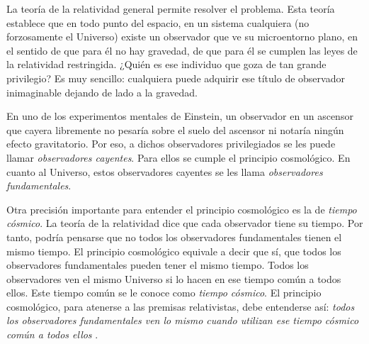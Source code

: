 \documentclass[a4paper,openright,10pt, oneside, final]{book}
\begin{document}
La teoría de la relatividad general permite resolver el problema. Esta teoría establece que en todo punto del espacio, en un sistema cualquiera (no forzosamente el Universo) existe un observador que ve su microentorno plano, en el sentido de que para él no hay gravedad, de que para él se cumplen las leyes de la relatividad restringida. ¿Quién es ese individuo que goza de tan grande privilegio? Es muy sencillo: cualquiera puede adquirir ese título de observador inimaginable dejando de lado a la gravedad.

En uno de los experimentos mentales de Einstein, un observador en un ascensor que cayera libremente no pesaría sobre el suelo del ascensor ni notaría ningún efecto gravitatorio. Por eso, a dichos observadores privilegiados se les puede llamar \textit{observadores cayentes}. Para ellos se cumple el principio cosmológico. En cuanto al Universo, estos observadores cayentes se les llama \textit{observadores fundamentales}.

Otra precisión importante para entender el principio cosmológico es la de \textit{tiempo cósmico}. La teoría de la relatividad dice que cada observador tiene su tiempo. Por tanto, podría pensarse que no todos los observadores fundamentales tienen el mismo tiempo. El principio cosmológico equivale a decir que sí, que todos los observadores fundamentales pueden tener el mismo tiempo. Todos los observadores ven el mismo Universo si lo hacen en ese tiempo común a todos ellos. Este tiempo común se le conoce como \textit{tiempo cósmico}. El principio cosmológico, para atenerse a las premisas relativistas, debe entenderse así: \textit{todos los observadores fundamentales ven lo mismo cuando utilizan ese tiempo cósmico común a todos ellos} \cite{1.02}.

\end{document}
